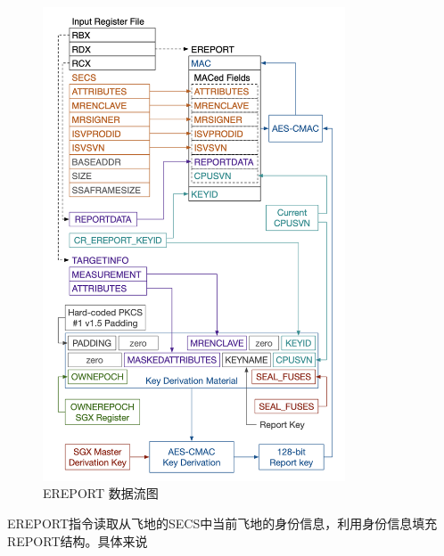 \begin{figure}
\centering
\includegraphics[width=0.8\textwidth]{images/EREPORT_data_flow.png}
\caption{EREPORT 数据流图}
\label{EREPORT_data_flow}
\end{figure}

EREPORT指令读取从飞地的SECS中当前飞地的身份信息，利用身份信息填充REPORT结构。具体来说


\subsection{}
